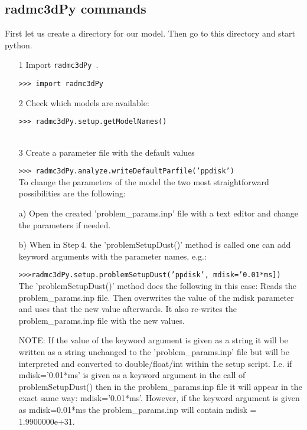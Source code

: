 \documentclass[12pt]{article}
\newcommand{\pymod}{{\tt  radmc3dPy }}
\begin{document}
\subsection*{radmc3dPy commands}
First let us create a directory for our model. Then go to this directory and start python. 

\begin{itemize}
\item[1] Import \pymod.

{\tt >>> import radmc3dPy}\\
\item[2] Check which models are available:

{\tt >>> radmc3dPy.setup.getModelNames()}\\
\\
\item[3] Create a parameter file with the default values

{\tt >>> radmc3dPy.analyze.writeDefaultParfile('ppdisk')}\\


To change the parameters of the model the two most straightforward possibilities are the following:

a) Open the created 'problem\_params.inp' file with a text editor and change the parameters if needed. 

b) When in  Step\,4. the 'problemSetupDust()' method is called one can add keyword arguments with the parameter
names, e.g.:

{\tt>>>radmc3dPy.setup.problemSetupDust('ppdisk', mdisk='0.01*ms])}\\

The 'problemSetupDust()' method does the following in this case: Reads the problem\_params.inp file. Then 
overwrites the value of the mdisk parameter and uses that the new value afterwards. It also re-writes the problem\_params.inp
file with the new values. 

NOTE: If the value of the keyword argument is given as a string it will be written as a string unchanged to the 'problem\_params.inp' file
but will be interpreted and converted to double/float/int within the setup script. I.e. if mdisk='0.01*ms' is given as a keyword argument
in the call of problemSetupDust()  then in the problem\_params.inp file it will appear in the exact same way: mdisk='0.01*ms'. 
However, if the keyword argument is given as mdisk=0.01*ms the problem\_params.inp will contain mdisk = 1.9900000e+31. 



\end{itemize}
\end{document}
